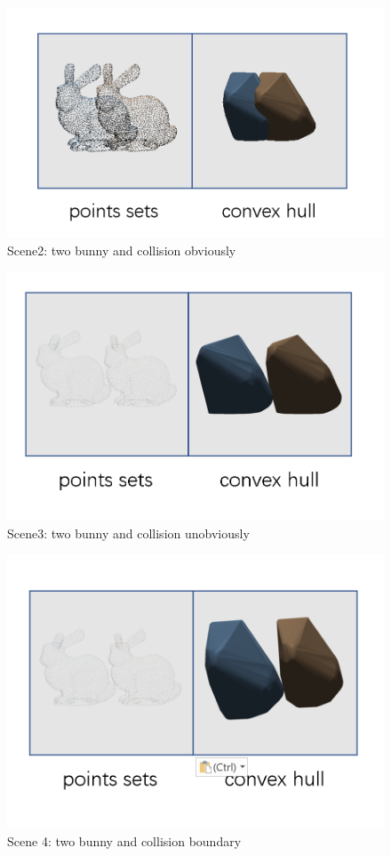 \documentclass[acmtog]{acmart}
\begin{document}
\begin{figure}[htbp]
	\centering
	\includegraphics[scale=0.2]{scene2.png}
	\caption{Scene2: two bunny and collision obviously}
	\label{fig:2}
\end{figure}

\begin{figure}[htbp]
	\centering
	\includegraphics[scale=0.2]{scene3.png}
	\caption{Scene3: two bunny and collision unobviously}
	\label{fig:3}
\end{figure}

\begin{figure}[htbp]
	\centering
	\includegraphics[scale=0.2]{scene4.png}
	\caption{Scene 4: two bunny and collision boundary}
	\label{fig:4}
\end{figure}
\end{document}
